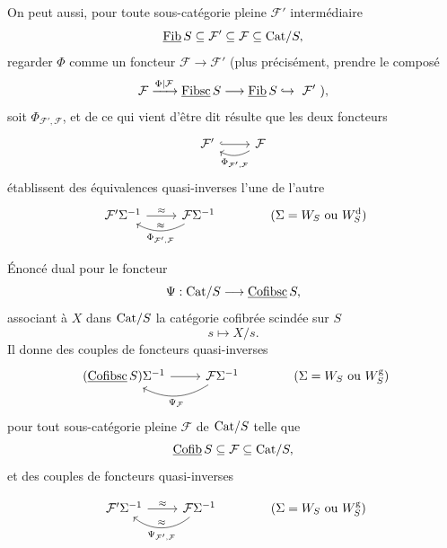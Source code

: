 On peut aussi, pour toute sous-catégorie pleine $\mathcal{F}'$ intermédiaire
\[ \underline{\mathrm{Fib}}\,S\subseteq\mathcal{F}'\subseteq\mathcal{F}\subseteq\mathrm{Cat}/S, \]
regarder $\Phi$ comme un foncteur $\mathcal{F}\longrightarrow\mathcal{F}'$ (plus précisément, prendre le composé
\[ \mathcal{F}\xrightarrow{\Phi|\mathcal{F}}\ul{Fibsc}\,S\longrightarrow\ul{Fib}\,S\hookrightarrow\ \mathcal{F}'\ ), \]
soit $\Phi_{\mathcal{F}',\mathcal{F}}$, et de ce qui vient d'être dit résulte que les deux foncteurs
\[
\begin{tikzcd}
\mathcal{F}' \arrow[r,hook] & \mathcal{F} \arrow[l,bend left,"\Phi_{\mathcal{F}',\mathcal{F}}"]
\end{tikzcd}
\]
établissent des équivalences quasi-inverses l'une de l'autre
\[
\begin{tikzcd}
\mathcal{F}'\Sigma^{-1} \arrow[r,"\approx"] & \mathcal{F}\Sigma^{-1} \arrow[l,bend left,"\approx"',"\Phi_{\mathcal{F}',\mathcal{F}}"]
\end{tikzcd}
\qquad\qquad(\Sigma=W_S\text{ ou }W_S^{\mathrm{d}})
\]

Énoncé dual pour le foncteur
\[ \Psi : \mathrm{Cat}/S\longrightarrow\underline{\mathrm{Cofibsc}}\,S, \]
associant à $X$ dans $\mathrm{Cat}/S$ la catégorie cofibrée scindée sur $S$
\[ s\longmapsto X/s. \]
Il donne des couples de foncteurs quasi-inverses
\[
\begin{tikzcd}
(\ul{Cofibsc}\,S)\Sigma^{-1} \arrow[r] & \mathcal{F}\Sigma^{-1} \arrow[l,bend left,"\Psi_{\mathcal{F}}"]
\end{tikzcd}
\qquad\qquad(\Sigma=W_S\text{ ou }W_S^{\mathrm{g}})
\]
pour tout sous-catégorie pleine $\mathcal{F}$ de $\mathrm{Cat}/S$ telle que %
\[ \underline{\mathrm{Cofib}}\,S\subseteq\mathcal{F}\subseteq\mathrm{Cat}/S, \]
et des couples de foncteurs quasi-inverses


\[
\begin{tikzcd}
\mathcal{F}'\Sigma^{-1} \arrow[r, "\approx"] & \mathcal{F}\Sigma^{-1} \arrow[l, bend left=40, "\approx"', "\Psi_{\mathcal{F}',\mathcal{F}}"]
\end{tikzcd}
\qquad\qquad (\Sigma = W_S \text{ ou } W_S^{\mathrm{g}})
\]

